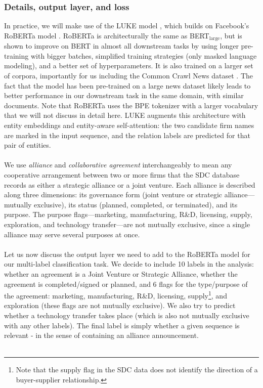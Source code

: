 \subsubsection{Details, output layer, and loss}
In practice, we will make use of the LUKE model \citep{yamada2020luke}, which builds on Facebook's RoBERTa model \citep{liu2019roberta}. RoBERTa is architecturally the same as BERT$_{\text{large}}$, but is shown to improve on BERT in almost all downstream tasks by using longer pre-training with bigger batches, simplified training strategies (only masked language modeling), and a better set of hyperparameters. It is also trained on a larger set of corpora, importantly for us including the Common Crawl News dataset \citep{nagel2016cc}. The fact that the model has been pre-trained on a large news dataset likely leads to better performance in our downstream task in the same domain, with similar documents. Note that RoBERTa uses the BPE tokenizer \citep{sennrich2015neural} with a larger vocabulary that we will not discuss in detail here. LUKE augments this architecture with entity embeddings and entity-aware self-attention: the two candidate firm names are marked in the input sequence, and the relation labels are predicted for that pair of entities. \\\\
We use \textit{alliance} and \textit{collaborative agreement} interchangeably to mean any cooperative arrangement between two or more firms that the SDC database records as either a strategic alliance or a joint venture. Each alliance is described along three dimensions: its governance form (joint venture or strategic alliance---mutually exclusive), its status (planned, completed, or terminated), and its purpose. The purpose flags---marketing, manufacturing, R\&D, licensing, supply, exploration, and technology transfer---are not mutually exclusive, since a single alliance may serve several purposes at once. \\\\
Let us now discuss the output layer we need to add to the RoBERTa model for our multi-label classification task. We decide to include 10 labels in the analysis: whether an agreement is a Joint Venture or Strategic Alliance, whether the agreement is completed/signed or planned, and 6 flags for the type/purpose of the agreement: marketing, manufacturing, R\&D, licensing, supply\footnote{Note that the supply flag in the SDC data does not identify the direction of a buyer-supplier relationship.}, and exploration (these flags are not mutually exclusive). We also try to predict whether a technology transfer takes place (which is also not mutually exclusive with any other labels). The final label is simply whether a given sequence is relevant - in the sense of containing an alliance announcement. \\\\
